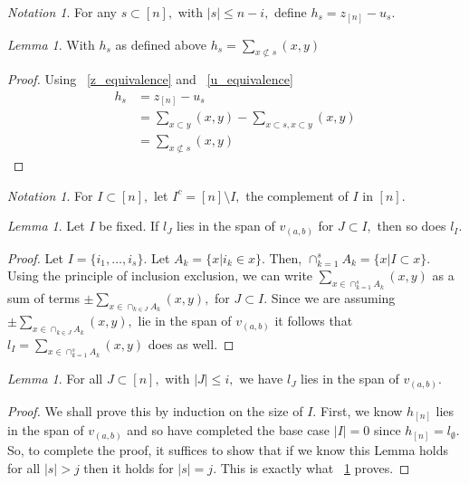 \documentclass[10 pt]{amsart}
\theoremstyle{plain}
\theoremstyle{definition}
\theoremstyle{remark}
\numberwithin{equation}{section}
\newtheorem{lem}[thm]{Lemma}
\theoremstyle{remark}
\newtheorem{note}[thm]{Notation}
\begin{document}
\begin{note}
For any $s \subset [n],$ with $|s| \leq n-i,$ define $h_s = z_{[n]} - u_s.$
\end{note}

\begin{lem}
\label{h_equivalence}
With $h_s$ as defined above $h_s = \sum_{x\not\subset s}^{}(x, y)$
\end{lem}
\begin{proof}
Using ~\ref{z_equivalence} and ~\ref{u_equivalence}
\begin{align*}
	h_s &= z_{[n]} - u_s \\
	&= \sum_{x\subset y}^{}(x, y)-\sum_{x\subset s,x\subset y}^{}(x, y)\\
	&= \sum_{x\not\subset s}^{}(x, y)
\end{align*}
\end{proof}
\begin{note}
For $I \subset[n],$ let $I^c = [n]\setminus I,$ the complement of $I$ in $[n].$
\end{note}

\begin{lem}
\label{l_induction_step}
Let $I$ be fixed. If $l_J$ lies in the span of $v_{(a, b)}$ for $J \subset I,$ then so does $l_I.$

\end{lem}
\begin{proof}
Let $I = \{i_1,\ldots, i_s\}.$ Let $A_k = \{x | i_k \in x\}.$ Then, $\cap_{k=1}^s A_k = \{x | I \subset x\}.$ Using the principle of inclusion exclusion, we can write $\sum_{x \in\cap_{k=1}^s A_k} (x, y)$ as a sum of terms $\pm \sum_{x \in\cap_{k \in J} A_k} (x, y),$ for $J \subset I.$ Since we are assuming $\pm \sum_{x \in\cap_{k \in J} A_k} (x, y),$ lie in the span of $v_{(a, b)}$ it follows that $l_I = \sum_{x \in\cap_{k=1}^s A_k} (x, y)$ does as well.

\end{proof}

\begin{lem}
For all $J \subset [n],$ with $|J| \leq i,$ we have $l_{J}$ lies in the span of $v_{(a , b)}.$ 
\end{lem}
\begin{proof}
We shall prove this by induction on the size of $I.$ First, we know $h_{[n]}$ lies in the span of $v_{(a, b)}$ and so have completed the base case $|I| = 0$ since $h_{[n]} = l_{\emptyset}.$ So, to complete the proof, it suffices to show that if we know this Lemma holds for all $|s|>j$ then it holds for $|s| = j.$  This is exactly what ~\ref{l_induction_step} proves.
\end{proof}
\end{document}
